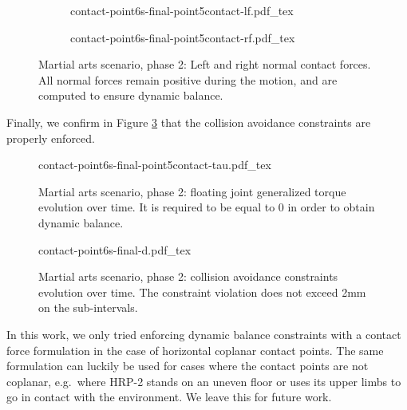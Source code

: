\begin{figure}
  \centering
  \begin{subfigure}{0.49\linewidth}
    \centering
        {\def\svgwidth{\linewidth}
          {\tiny
            
                       {contact-point6s-final-point5contact-lf.pdf_tex}
          }
        }
  \end{subfigure}
  \begin{subfigure}{0.49\linewidth}
    \centering
        {\def\svgwidth{\linewidth}
          {\tiny
            
                       {contact-point6s-final-point5contact-rf.pdf_tex}
          }
        }
  \end{subfigure}
  \caption{Martial arts scenario, phase 2: Left and right normal
    contact forces. All normal forces remain positive during the
    motion, and are computed to ensure dynamic balance.}
  \label{fig:chap3-contact-point6s-final-f}
\end{figure}

Finally, we confirm in Figure \ref{fig:chap3-contact-point6s-final-d}
that the collision avoidance constraints are properly enforced.

\begin{figure}
  \centering
      {\def\svgwidth{0.8\linewidth}
        {\scriptsize
          
                     {contact-point6s-final-point5contact-tau.pdf_tex}
        }
      }
  \caption{Martial arts scenario, phase 2: floating joint generalized
    torque evolution over time. It is required to be equal to 0 in
    order to obtain dynamic balance.}
  \label{fig:chap3-contact-point6s-final-tau}
\end{figure}

\begin{figure}
  \centering
      {\def\svgwidth{0.8\linewidth}
        {\scriptsize
          
                     {contact-point6s-final-d.pdf_tex}
        }
      }
  \caption{Martial arts scenario, phase 2: collision avoidance
    constraints evolution over time. The constraint violation does not
    exceed 2mm on the sub-intervals.}
  \label{fig:chap3-contact-point6s-final-d}
\end{figure}

In this work, we only tried enforcing dynamic balance constraints with
a contact force formulation in the case of horizontal coplanar contact
points. The same formulation can luckily be used for cases where the
contact points are not coplanar, e.g.\ where HRP-2 stands on an uneven
floor or uses its upper limbs to go in contact with the
environment. We leave this for future work.

